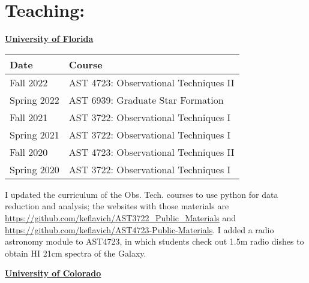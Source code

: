\begin{minipage}{\textwidth}
\setlength{\extrarowheight}{4pt}
\section*{Teaching: }
\vspace{-6pt}

    \textbf{\underline{University of Florida}}

\begin{tabular}{ll}
    Date         & Course \\%
    \hline
     Fall 2022    &   AST 4723: Observational Techniques II \\
     Spring 2022  &   AST 6939: Graduate Star Formation \\
     Fall 2021    &   AST 3722: Observational Techniques I  \\%
     Spring 2021  &   AST 3722: Observational Techniques I  \\%
     Fall 2020    &   AST 4723: Observational Techniques II \\%
     Spring 2020  &   AST 3722: Observational Techniques I  \\%
     \hline
\end{tabular}

I updated the curriculum of the Obs. Tech. courses to use python for data reduction and analysis; 
the websites with those materials are \url{https://github.com/keflavich/AST3722_Public_Materials}
and \url{https://github.com/keflavich/AST4723-Public-Materials}.  I added a radio astronomy module to 
AST4723, in which students check out 1.5m radio dishes to obtain HI 21cm spectra of the Galaxy.

    \vspace{12pt}
\textbf{\underline{University of Colorado}}


\end{minipage}
